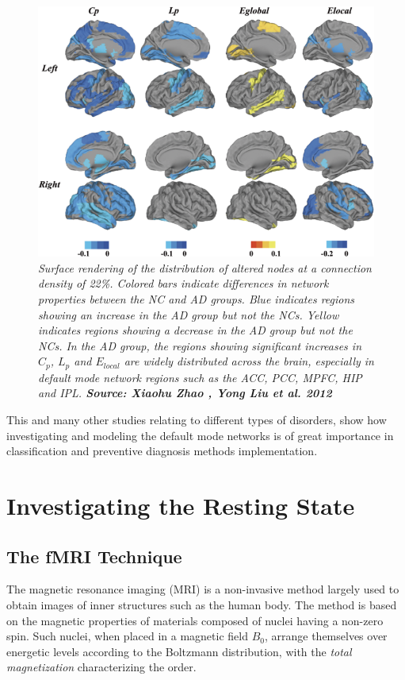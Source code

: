 \documentclass[12pt,openright,twoside,a4paper]{book}
\begin{document}
\begin{figure}[!h]
\centering
\includegraphics[scale=0.5]{rsz}
\caption{\textit{Surface rendering of the distribution of altered nodes at a connection density of 22\%.
Colored bars indicate differences in network properties between the NC and AD groups. Blue indicates regions showing an increase in the AD group but not the NCs. Yellow indicates regions showing a decrease in the AD group but not the NCs. In the AD group, the regions showing significant increases in $C_p$, $L_p$ and $E_{local}$ are widely distributed across the brain, especially in default mode network regions such as the ACC, PCC, MPFC, HIP and IPL. \textbf{Source: Xiaohu Zhao , Yong Liu et al. 2012 \cite{ssa}}}}
\label{rsz}
\end{figure}

This and many other studies relating to different types of disorders, show how investigating and modeling the default mode networks is of great importance in classification and preventive diagnosis methods implementation.

\clearpage

\section{Investigating the Resting State}

\subsection{The fMRI Technique}

The magnetic resonance imaging (MRI) is a non-invasive method largely used to obtain images of inner structures such as the human body.
The method is based on the magnetic properties of materials composed of nuclei having a non-zero spin.
Such nuclei, when placed in a magnetic  field $B_0$, arrange themselves over energetic levels according to the Boltzmann distribution, with the \textit{total magnetization} characterizing the order.
\end{document}
